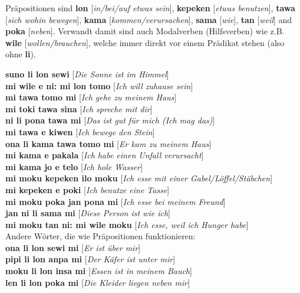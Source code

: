 \documentclass[10pt,a4paper]{article}
\begin{document}
Präpositionen sind \textbf{lon} [\textit{in/bei/auf etwas sein}], \textbf{kepeken} [\textit{etwas benutzen}], \textbf{tawa} [\textit{sich wohin bewegen}], \textbf{kama} [\textit{kommen/verursachen}], \textbf{sama} [\textit{wie}], \textbf{tan} [\textit{weil}] and \textbf{poka} [\textit{neben}]. Verwandt damit sind auch Modalverben (Hilfsverben) wie z.B. \textbf{wile} [\textit{wollen/brauchen}], welche immer direkt vor einem Prädikat stehen (also ohne \textbf{li}).

\begin{multicols}{2}
\noindent\textbf{suno li lon sewi} [\textit{Die Sonne ist im Himmel}]\\
\noindent\textbf{mi wile e ni: mi lon tomo} [\textit{Ich will zuhause sein}]\\
\noindent\textbf{mi tawa tomo mi} [\textit{Ich gehe zu meinem Haus}]\\
\noindent\textbf{mi toki tawa sina} [\textit{Ich spreche mit dir}]\\
\noindent\textbf{ni li pona tawa mi} [\textit{Das ist gut für mich (Ich mag das)}]\\
\noindent\textbf{mi tawa e kiwen} [\textit{Ich bewege den Stein}]\\
\noindent\textbf{ona li kama tawa tomo mi} [\textit{Er kam zu meinem Haus}]\\
\noindent\textbf{mi kama e pakala} [\textit{Ich habe einen Unfall verursacht}]\\
\noindent\textbf{mi kama jo e telo} [\textit{Ich hole Wasser}]\\
\noindent\textbf{mi moku kepeken ilo moku} [\textit{Ich esse mit einer Gabel/Löffel/Stäbchen}]\\
\noindent\textbf{mi kepeken e poki} [\textit{Ich benutze eine Tasse}]\\
\noindent\textbf{mi moku poka jan pona mi} [\textit{Ich esse bei meinem Freund}]\\
\noindent\textbf{jan ni li sama mi} [\textit{Diese Person ist wie ich}]\\
\noindent\textbf{mi moku tan ni: mi wile moku} [\textit{Ich esse, weil ich Hunger habe}]\\
\noindent Andere Wörter, die wie Präpositionen funktionieren:\\
\noindent\textbf{ona li lon sewi mi} [\textit{Er ist über mir}]\\
\noindent\textbf{pipi li lon anpa mi} [\textit{Der Käfer ist unter mir}]\\
\noindent\textbf{moku li lon insa mi} [\textit{Essen ist in meinem Bauch}]\\
\noindent\textbf{len li lon poka mi} [\textit{Die Kleider liegen neben mir}]
\end{multicols}
\end{document}
